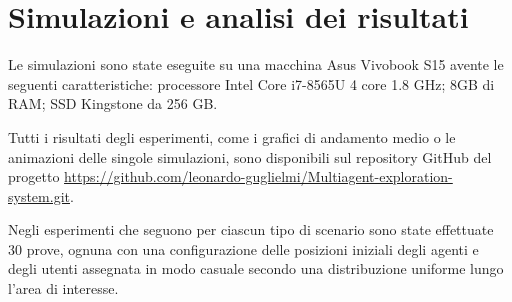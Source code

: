 \section{Simulazioni e analisi dei risultati} \label{sec:res_analisys}
Le simulazioni sono state eseguite su una macchina Asus Vivobook S15 avente le seguenti caratteristiche: processore Intel Core i7-8565U 4 core 1.8 GHz; 8GB di RAM; SSD Kingstone da 256 GB.

Tutti i risultati degli esperimenti, come i grafici di andamento medio o le animazioni delle singole simulazioni, sono disponibili sul repository GitHub del progetto \href{https://github.com/leonardo-guglielmi/Multiagent-exploration-system.git}{\textsf{https://github.com/leonardo-guglielmi/Multiagent-exploration-system.git}}.

Negli esperimenti che seguono per ciascun tipo di scenario sono state effettuate 30 prove, ognuna con una configurazione delle posizioni iniziali degli agenti e degli utenti assegnata in modo casuale secondo una distribuzione uniforme lungo l'area di interesse.

\pagebreak


\pagebreak


\pagebreak


